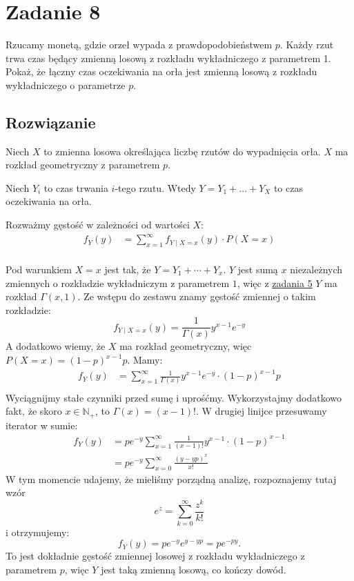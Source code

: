 \section{Zadanie 8}
Rzucamy monetą, gdzie orzeł wypada z prawdopodobieństwem \(p\). Każdy rzut trwa
czas będący zmienną losową z rozkładu wykładniczego z parametrem 1.
Pokaż, że łączny czas oczekiwania na orła jest zmienną losową z rozkładu
wykładniczego o parametrze \(p\).

\subsection*{Rozwiązanie}
Niech \(X\) to zmienna losowa określająca liczbę rzutów do wypadnięcia orła.
\(X\) ma rozkład geometryczny z parametrem \(p\).

Niech \(Y_i\) to czas trwania \(i\)-tego rzutu.
Wtedy \(Y = Y_1 + \dots + Y_X\) to czas oczekiwania na orła.

Rozważmy gęstość w zależności od wartości \(X\):
\begin{align*}
	f_Y(y)
	 & = \sum_{x = 1}^{\infty} f_{Y \mid X = x}(y) \cdot P(X = x) \\
\end{align*}

Pod warunkiem \(X=x\) jest tak, że \(Y = Y_1 + \cdots + Y_x\).
\(Y\) jest sumą \(x\) niezależnych zmiennych o rozkładzie wykładniczym z parametrem
\(1\), więc z \hyperref[set09.task05]{zadania 5} \(Y\) ma rozkład
\(\Gamma(x, 1)\). Ze wstępu do zestawu znamy gęstość zmiennej o takim rozkładzie:
\[
	f_{Y \mid X = x}(y) = \frac{1}{\Gamma(x)} y^{x-1} e^{-y}
\]
A dodatkowo wiemy, że \(X\) ma rozkład geometryczny, więc
\(P(X = x) = (1-p)^{x-1} p\).
Mamy:
\begin{align*}
	f_Y(y)
	 & = \sum_{x = 1}^{\infty} \frac{1}{\Gamma(x)} y^{x-1} e^{-y} \cdot (1-p)^{x-1} p \\
\end{align*}
Wyciągnijmy stałe czynniki przed sumę i uprośćmy.
Wykorzystajmy dodatkowo fakt, że skoro \(x \in \mathbb{N}_+\),
to \(\Gamma(x) = (x-1)!\).
W drugiej linijce przesuwamy iterator w sumie:
\begin{align*}
	f_Y(y)
	 & = p e^{-y} \sum_{x = 1}^{\infty} \frac{1}{(x-1)!} y^{x-1} \cdot (1-p)^{x-1} \\
	 & = p e^{-y} \sum_{x = 0}^{\infty} \frac{(y-yp)^x}{x!}
\end{align*}
W tym momencie udajemy, że mieliśmy porządną analizę, rozpoznajemy tutaj wzór
\[e^z = \sum_{k=0}^{\infty} \frac{z^k}{k!}\]
i otrzymujemy:
\[
	f_Y(y) = p e^{-y} e^{y-yp} = p e^{-py}.
\]
To jest dokładnie gęstość zmiennej losowej z rozkładu wykładniczego z parametrem
\(p\), więc \(Y\) jest taką zmienną losową, co kończy dowód.
